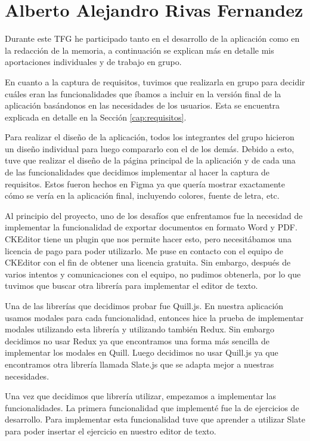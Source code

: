 \section{Alberto Alejandro Rivas Fernandez}
Durante este TFG he participado tanto en el desarrollo de la aplicación como en la redacción de la memoria, a continuación se explican más en detalle mis aportaciones individuales y de trabajo en grupo.

En cuanto a la captura de requisitos, tuvimos que realizarla en grupo para decidir cuáles eran las funcionalidades que íbamos a incluir en la versión final de la aplicación basándonos en las necesidades de los usuarios. Esta se encuentra explicada en detalle en la Sección \ref{cap:requisitos}.

Para realizar el diseño de la aplicación, todos los integrantes del grupo hicieron un diseño individual para luego compararlo con el de los demás. Debido a esto, tuve que realizar el diseño de la página principal de la aplicación y de cada una de las funcionalidades que decidimos implementar al hacer la captura de requisitos. Estos fueron hechos en Figma ya que quería mostrar exactamente cómo se vería en la aplicación final, incluyendo colores, fuente de letra, etc.

Al principio del proyecto, uno de los desafíos que enfrentamos fue la necesidad de implementar la funcionalidad de exportar documentos en formato Word y PDF. CKEditor tiene un plugin que nos permite hacer esto, pero necesitábamos una licencia de pago para poder utilizarlo. Me puse en contacto con el equipo de CKEditor con el fin de obtener una licencia gratuita. Sin embargo, después de varios intentos y comunicaciones con el equipo, no pudimos obtenerla, por lo que tuvimos que buscar otra librería para implementar el editor de texto.

Una de las librerías que decidimos probar fue Quill.js. En nuestra aplicación usamos modales para cada funcionalidad, entonces hice la prueba de implementar modales utilizando esta librería y utilizando también Redux. Sin embargo decidimos no usar Redux ya que encontramos una forma más sencilla de implementar los modales en Quill. Luego decidimos no usar Quill.js ya que encontramos otra librería llamada Slate.js que se adapta mejor a nuestras necesidades.

Una vez que decidimos que librería utilizar, empezamos a implementar las funcionalidades. La primera funcionalidad que implementé fue la de ejercicios de desarrollo. Para implementar esta funcionalidad tuve que aprender a utilizar Slate para poder insertar el ejercicio en nuestro editor de texto.

